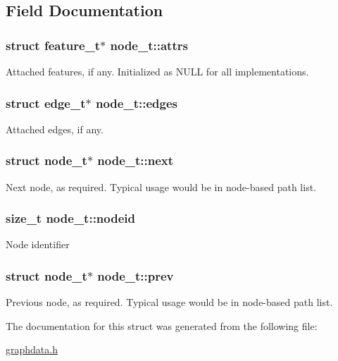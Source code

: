 \subsection{Field Documentation}
\subsubsection[{\texorpdfstring{attrs}{attrs}}]{\setlength{\rightskip}{0pt plus 5cm}struct {\bf feature\+\_\+t}$\ast$ node\+\_\+t\+::attrs}\hypertarget{structnode__t_a6d2c8715312b206eab73c385d58870e5}{}\label{structnode__t_a6d2c8715312b206eab73c385d58870e5}
Attached features, if any. Initialized as N\+U\+LL for all implementations. 
\subsubsection[{\texorpdfstring{edges}{edges}}]{\setlength{\rightskip}{0pt plus 5cm}struct {\bf edge\+\_\+t}$\ast$ node\+\_\+t\+::edges}\hypertarget{structnode__t_a8d25d828a2823867dec243aee51835cb}{}\label{structnode__t_a8d25d828a2823867dec243aee51835cb}
Attached edges, if any. 
\subsubsection[{\texorpdfstring{next}{next}}]{\setlength{\rightskip}{0pt plus 5cm}struct {\bf node\+\_\+t}$\ast$ node\+\_\+t\+::next}\hypertarget{structnode__t_aca548c9bafe54ba9db19d40a7a7f1cb3}{}\label{structnode__t_aca548c9bafe54ba9db19d40a7a7f1cb3}


Next node, as required. Typical usage would be in node-\/based path list. 

\subsubsection[{\texorpdfstring{nodeid}{nodeid}}]{\setlength{\rightskip}{0pt plus 5cm}size\+\_\+t node\+\_\+t\+::nodeid}\hypertarget{structnode__t_a3fe17f2fd1e7a7b2ec5f7bfae826816c}{}\label{structnode__t_a3fe17f2fd1e7a7b2ec5f7bfae826816c}
Node identifier 
\subsubsection[{\texorpdfstring{prev}{prev}}]{\setlength{\rightskip}{0pt plus 5cm}struct {\bf node\+\_\+t}$\ast$ node\+\_\+t\+::prev}\hypertarget{structnode__t_aed5643ccd87b35d3fb69f04903e59b95}{}\label{structnode__t_aed5643ccd87b35d3fb69f04903e59b95}


Previous node, as required. Typical usage would be in node-\/based path list. 



The documentation for this struct was generated from the following file\+:\begin{DoxyCompactItemize}
\item 
\hyperlink{graphdata_8h}{graphdata.\+h}\end{DoxyCompactItemize}
